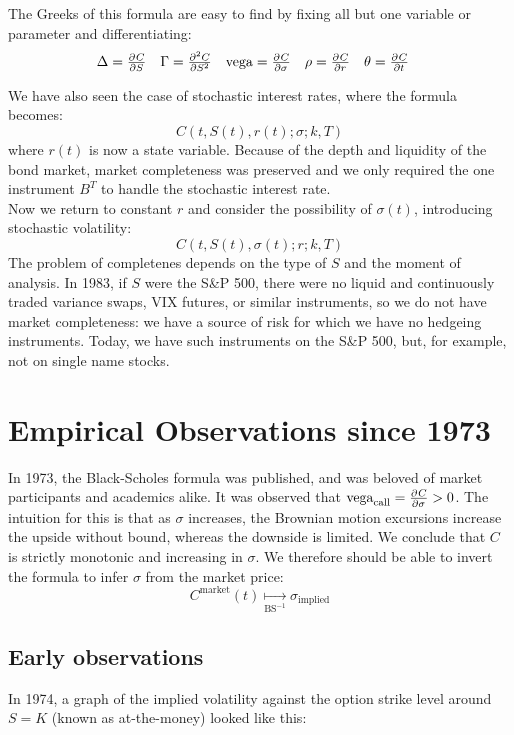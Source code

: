 \documentclass[11pt]{article}
\begin{document}
The Greeks of this formula are easy to find by fixing all but one variable or parameter and differentiating:
\begin{align*}
\Delta &= \pd{C}{S} & 
\Gamma &= \pd[2]{C}{S} &
\text{vega} &= \pd{C}{\sigma} &
\rho &= \pd{C}{r} &
\theta &= \pd{C}{t}
\end{align*}

We have also seen the case of stochastic interest rates, where the formula becomes:
$$C(t, S(t), r(t); \sigma; k, T)$$
where $r(t)$ is now a state variable. Because of the depth and liquidity of the bond market, market completeness was preserved and we only required the one instrument $B^T$ to handle the stochastic interest rate. \\

Now we return to constant $r$ and consider the possibility of $\sigma(t)$, introducing stochastic volatility:
$$C(t, S(t), \sigma(t); r; k, T)$$
The problem of completenes depends on the type of $S$ and the moment of analysis. In 1983, if $S$ were the S\&P 500, there were no liquid and continuously traded variance swaps, VIX futures, or similar instruments, so we do not have market completeness: we have a source of risk for which we have no hedgeing instruments. Today, we have such instruments on the S\&P 500, but, for example, not on single name stocks. 

\section{Empirical Observations since 1973}

In 1973, the Black-Scholes formula was published, and was beloved of market participants and academics alike. It was observed that $\text{vega}_\text{call} = \pd{C}{\sigma} > 0$. The intuition for this is that as $\sigma$ increases, the Brownian motion excursions increase the upside without bound, whereas the downside is limited. We conclude that $C$ is strictly monotonic and increasing in $\sigma$. We therefore should be able to invert the formula to infer $\sigma$ from the market price:
$$C^\text{market}(t) \underset{\text{BS}^{-1}}\longmapsto \sigma_\text{implied}$$

\subsection{Early observations}
In 1974, a graph of the implied volatility against the option strike level around $S=K$ (known as at-the-money) looked like this:\\ 
\end{document}
